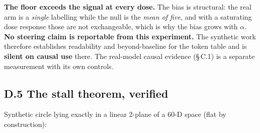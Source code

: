 \textbf{The floor exceeds the signal at every dose.} The bias is structural: the real arm is a \emph{single}
labelling while the null is the \emph{mean of five}, and with a saturating dose response those are not
exchangeable, which is why the bias grows with \(\alpha\). \textbf{No steering claim is reportable from this
experiment.} The synthetic work therefore establishes readability and beyond-baseline for the token
table and is \textbf{silent on causal use} there. The real-model causal evidence (\S\,C.1) is a separate
measurement with its own controls.

\hypertarget{d.5-the-stall-theorem-verified}{%
\subsection{D.5 The stall theorem, verified}\label{d.5-the-stall-theorem-verified}}

Synthetic circle lying exactly in a linear 2-plane of a 60-D space (flat by construction):

